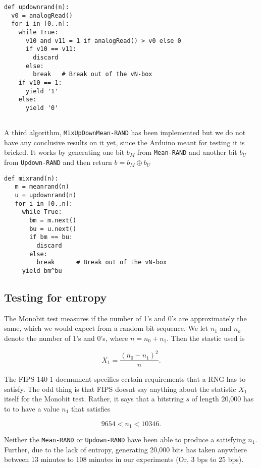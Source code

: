 \documentclass[a4paper]{article}           %
\begin{document}
\begin{lstlisting}[caption=The \texttt{Updown-RAND} algorithm]
def updownrand(n):
  v0 = analogRead()
  for i in [0..n]:
    while True:
      v10 and v11 = 1 if analogRead() > v0 else 0
      if v10 == v11: 
        discard
      else:
        break   # Break out of the vN-box
    if v10 == 1:
      yield '1'
    else:
      yield '0'
     
\end{lstlisting}

A third algorithm, \texttt{MixUpDownMean-RAND} has been implemented but we do not have any conclusive results on it yet, since the Arduino meant for testing it is bricked. It works by generating one bit $b_M$ from \texttt{Mean-RAND} and another bit $b_U$ from \texttt{Updown-RAND} and then return $b = b_M \oplus b_U$

\begin{lstlisting}[caption=The \texttt{MixUpDownMean-RAND} algorithm]
def mixrand(n):
   m = meanrand(n)
   u = updownrand(n)
   for i in [0..n]:
     while True:
       bm = m.next()
       bu = u.next()
       if bm == bu:
         discard
       else:
         break      # Break out of the vN-box
     yield bm^bu
\end{lstlisting}


\subsection{Testing for entropy}

The Monobit test measures if the number of 1's and 0's are approximately the same, which we would expect from a random bit sequence. We let $n_1$ and $n_o$ denote the number of 1's and 0's, where $n = n_0 + n_1$. Then the stastic used is

\[
X_1 = \frac{(n_0 - n_1)^2}{n}.
\]

The FIPS 140-1 docmument specifies certain requirements that a RNG has to satisfy. The odd thing is that FIPS doesnt say anything about the statistic $X_1$ itself for the Monobit test. Rather, it says that a bitstring $s$ of length 20,000 has to to have a value $n_1$ that satisfies

\[
9654 < n_1 < 10346.
\]

Neither the \texttt{Mean-RAND} or \texttt{Updown-RAND} have been able to produce a satisfying $n_1$. Further, due to the lack of entropy, generating 20,000 bits has taken anywhere between 13 minutes to 108 minutes in our experiments (Or, 3 bps to 25 bps).\\
\end{document}
